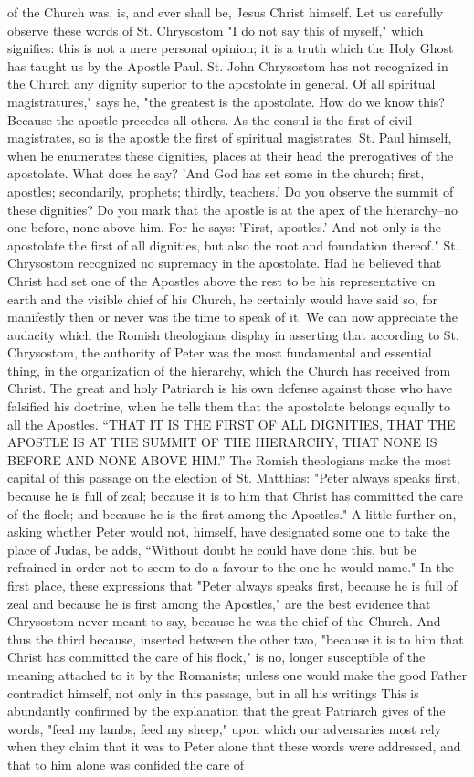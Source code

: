 of the Church was, is, and ever shall be, Jesus Christ himself. Let us carefully observe these words of St. Chrysostom "I do not say this of myself," which signifies: this is not a mere personal opinion; it is a truth which the Holy Ghost has taught us by the Apostle Paul. St. John Chrysostom has not recognized in the Church any dignity superior to the apostolate in general. Of all spiritual magistratures," says he, "the greatest is the apostolate. How do we know this? Because the apostle precedes all others. As the consul is the first of civil magistrates, so is the apostle the first of spiritual magistrates. St. Paul himself, when he enumerates these dignities, places at their head the prerogatives of the apostolate. What does he say? 'And God has set some in the church; first, apostles; secondarily, prophets; thirdly, teachers.' Do you observe the summit of these dignities? Do you mark that the apostle is at the apex of the hierarchy--no one before, none above him. For he says: 'First, apostles.' And not only is the apostolate the first of all dignities, but also the root and foundation thereof." St. Chrysostom recognized no supremacy in the apostolate. Had he believed that Christ had set one of the Apostles above the rest to be his representative on earth and the visible chief of his Church, he certainly would have said so, for manifestly then or never was the time to speak of it. We can now appreciate the audacity which the Romish theologians display in asserting that according to St. Chrysostom, the authority of Peter was the most fundamental and essential thing, in the organization of the hierarchy, which the Church has received from Christ. The great and holy Patriarch is his own defense against those who have falsified his doctrine, when he tells them that the apostolate belongs equally to all the Apostles. “THAT IT IS THE FIRST OF ALL DIGNITIES, THAT THE APOSTLE IS AT THE SUMMIT OF THE HIERARCHY, THAT NONE IS BEFORE AND NONE ABOVE HIM.” The Romish theologians make the most capital of this passage on the election of St. Matthias: "Peter always speaks first, because he is full of zeal; because it is to him that Christ has committed the care of the flock; and because he is the first among the Apostles." A little further on, asking whether Peter would not, himself, have designated some one to take the place of Judas, be adds, “Without doubt he could have done this, but be refrained in order not to seem to do a favour to the one he would name." In the first place, these expressions that "Peter always speaks first, because he is full of zeal and because he is first among the Apostles," are the best evidence that Chrysostom never meant to say, because he was the chief of the Church. And thus the third because, inserted between the other two, "because it is to him that Christ has committed the care of his flock," is no, longer susceptible of the meaning attached to it by the Romanists; unless one would make the good Father contradict himself, not only in this passage, but in all his writings This is abundantly confirmed by the explanation that the great Patriarch gives of the words, "feed my lambs, feed my sheep," upon which our adversaries most rely when they claim that it was to Peter alone that these words were addressed, and that to him alone was confided the care of 